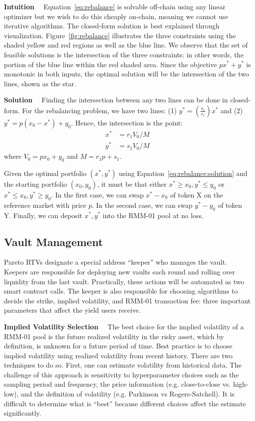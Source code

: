 \documentclass[hidelinks, 12pt]{article}
\begin{document}
\textbf{Intuition}$\quad$ Equation~\ref{eq:rebalance} is solvable off-chain using any linear optimizer but we wish to do this cheaply on-chain, meaning we cannot use iterative algorithms. The closed-form solution is best explained through visualization. Figure~\ref{fig:rebalance} illustrates the three constraints using the shaded yellow and red regions as well as the blue line. We observe that the set of feasible solutions is the intersection of the three constraints: in other words, the portion of the blue line within the red shaded area. Since the objective $p x^* + y^*$ is monotonic in both inputs, the optimal solution will be the intersection of the two lines, shown as the star.

\textbf{Solution}$\quad$ Finding the intersection between any two lines can be done in closed-form. For the rebalancing problem, we have two lines: (1) $y^* = \left(\frac{s_1}{r_1}\right)x^*$ and (2) $y^* = p(x_0 - x^*) + y_0$. Hence, the intersection is the point:
\begin{align}
    x^* &= r_1 V_0 / M \label{eq:rebalance:solution} \\
    y^* &= s_1 V_0 / M \nonumber
\end{align}
where $V_0 = px_0 + y_0$ and $M = r_1 p + s_1$.

Given the optimal portfolio $(x^*, y^*)$ using Equation~\ref{eq:rebalance:solution} and the starting portfolio $(x_0, y_0)$, it must be that either $x^* \geq x_0, y^* \leq y_0$ or $x^* \leq x_0, y^* \geq y_0$. In the first case, we can swap $x^* - x_0$ of token X on the reference market with price $p$. In the second case, we can swap $y^* - y_0$ of token Y. Finally, we can deposit $x^*, y^*$ into the RMM-01 pool at no loss.

\subsection{Vault Management}
\label{sec:management}

Pareto RTVs designate a special address ``keeper'' who manages the vault. Keepers are responsible for deploying new vaults each round and rolling over liquidity from the last vault. Practically, these actions will be automated as two smart contract calls.
The keeper is also responsible for choosing algorithms to decide the strike, implied volatility, and RMM-01 transaction fee: three important parameters that affect the yield users receive. 

\textbf{Implied Volatility Selection}$\quad$ The best choice for the implied volatility of a RMM-01 pool is the future realized volatility in the risky asset, which by definition, is unknown for a future period of time. 
Best practice is to choose implied volatility using realized volatility from recent history.
There are two techniques to do so. First, one can estimate volatility from historical data. The challenge of this approach is sensitivity to hyperparameter choices such as the sampling period and frequency, the price information (e.g. close-to-close vs. high-low), and the definition of volatility (e.g. Parkinson vs Rogers-Satchell). 
It is difficult to determine what is ``best'' because different choices affect the estimate significantly. 
\end{document}
